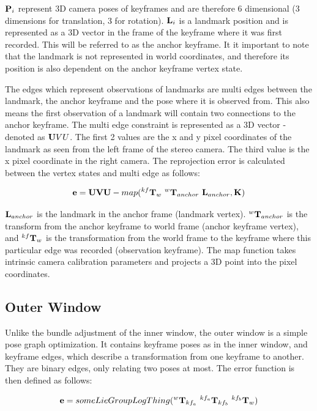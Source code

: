 $\mathbf P_i$ represent 3D camera poses of keyframes and are therefore 6 dimensional (3 dimensions for translation, 3 for rotation).  $\mathbf L_i$ is a landmark position and is represented as a 3D vector in the frame of the keyframe where it was first recorded.  This will be referred to as the anchor keyframe.  It it important to note that the landmark is not represented in world coordinates, and therefore its position is also dependent on the anchor keyframe vertex state.

The edges which represent observations of landmarks are multi edges between the landmark, the anchor keyframe and the pose where it is observed from.  This also means the first observation of a landmark will contain two connections to the anchor keyframe.  The multi edge constraint is represented as a 3D vector - denoted as $\mathbf UVU$.  The first 2 values are the x and y pixel coordinates of the landmark as seen from the left frame of the stereo camera.  The third value is the x pixel coordinate in the right camera.  The reprojection error is calculated between the vertex states and multi edge as follows:

\begin{align}
 \mathbf e = \mathbf{UVU} - map( ^{kf}\mathbf T_w \ ^w \mathbf T_{anchor} \ \mathbf L_{anchor}, \mathbf K )
\end{align}

$\mathbf L_{anchor}$ is the landmark in the anchor frame (landmark vertex).  $^w \mathbf T_{anchor}$ is the transform from the anchor keyframe to world frame (anchor keyframe vertex), and $^{kf}\mathbf T_w$ is the transformation from the world frame to the keyframe where this particular edge was recorded (observation keyframe).  The map function takes intrinsic camera calibration parameters and projects a 3D point into the pixel coordinates.

\subsection{Outer Window}

Unlike the bundle adjustment of the inner window, the outer window is a simple pose graph optimization.  It contains keyframe poses as in the inner window, and keyframe edges, which describe a transformation from one keyframe to another.  They are binary edges, only relating two poses at most.  The error function is then defined as follows:

\begin{align}
 \bv e =  someLieGroupLogThing(^{w}\bv T_{kf_a} \ ^{kf_a} \bv T_{kf_b} \ ^{kf_b} \bv T_{w})
\end{align}

